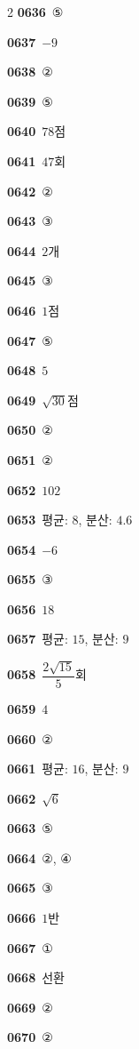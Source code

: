 \documentclass[10pt,a4paper]{article}
\begin{document}
\begin{multicols}{2}
\noindent\textbf{0636}\ ⑤\par
\noindent\textbf{0637}\ $-9$\par
\noindent\textbf{0638}\ ②\par
\noindent\textbf{0639}\ ⑤\par
\noindent\textbf{0640}\ $78$점\par
\noindent\textbf{0641}\ $47$회\par
\noindent\textbf{0642}\ ②\par
\noindent\textbf{0643}\ ③\par
\noindent\textbf{0644}\ $2$개\par
\noindent\textbf{0645}\ ③\par
\noindent\textbf{0646}\ $1$점\par
\noindent\textbf{0647}\ ⑤\par
\noindent\textbf{0648}\ $5$\par
\noindent\textbf{0649}\ $\sqrt{30}$점\par
\noindent\textbf{0650}\ ②\par
\noindent\textbf{0651}\ ②\par
\noindent\textbf{0652}\ $102$\par
\noindent\textbf{0653}\ 평균: $8$, 분산: $4.6$\par
\noindent\textbf{0654}\ $-6$\par
\noindent\textbf{0655}\ ③\par
\noindent\textbf{0656}\ $18$\par
\noindent\textbf{0657}\ 평균: $15$, 분산: $9$\par
\noindent\textbf{0658}\ $\dfrac{2\sqrt{15}}{5}$회\par
\noindent\textbf{0659}\ $4$\par
\noindent\textbf{0660}\ ②\par
\noindent\textbf{0661}\ 평균: $16$, 분산: $9$\par
\noindent\textbf{0662}\ $\sqrt{6}$\par
\noindent\textbf{0663}\ ⑤\par
\noindent\textbf{0664}\ ②, ④\par
\noindent\textbf{0665}\ ③\par
\noindent\textbf{0666}\ $1$반\par
\noindent\textbf{0667}\ ①\par
\noindent\textbf{0668}\ 선환\par
\noindent\textbf{0669}\ ②\par
\noindent\textbf{0670}\ ②\par

\end{multicols}
\end{document}
